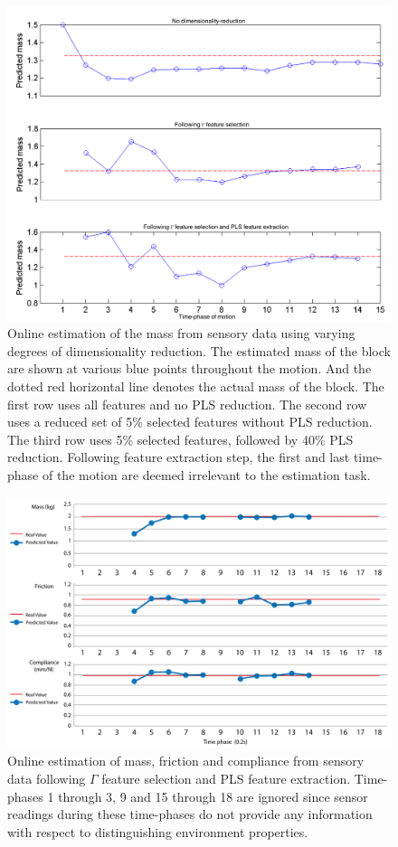 \begin{figure}[]
	\centering
	\includegraphics[width=\linewidth]{images/online_m}
	\caption{Online estimation of the mass from sensory data using varying degrees of dimensionality reduction. 
    The estimated mass of the block are shown at various blue points throughout the motion. 
    And the dotted red horizontal line denotes the actual mass of the block. The first row uses all features and no PLS reduction. 
    The second row uses a reduced set of 5\% selected features without PLS reduction. 
    The third row uses 5\% selected features, followed by 40\% PLS reduction.
    Following feature extraction step, the first and last time-phase of the motion are deemed irrelevant to the estimation task.}
	\label{fig:online}
\end{figure}

\begin{figure}[]
	\centering
	\includegraphics[width=\linewidth]{images/online_mfc_vid}
	\caption{Online estimation of mass, friction and compliance from sensory data following $\Gamma$ feature selection and PLS feature extraction. 
    Time-phases 1 through 3, 9 and 15 through 18 are ignored since sensor readings during these time-phases do not provide any information with respect to distinguishing environment properties.}
	\label{fig:online_mfc_vid}
\end{figure}


